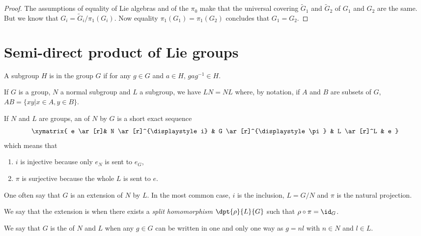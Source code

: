 \begin{proof}
	The assumptions of equality of Lie algebras and of the $\pi_0$ make that the universal covering $\tilde G_1$ and $\tilde G_2$ of $G_1$ and $G_2$ are the same. But we know that $G_i=\tilde G_i/\pi_1(G_i)$. Now equality $\pi_1(G_1)=\pi_1(G_2)$ concludes that $G_1=G_2$.
\end{proof}

\section{Semi-direct product of Lie groups}

\begin{definition}
	A subgroup $H$ is  in the group $G$ if for any $g\in G$ and $a\in H$, $gag^{-1}\in H$.
\end{definition}

If $G$ is a group, $N$ a normal subgroup and $L$ a subgroup, we have $LN=NL$ where, by notation, if $A$ and $B$ are subsets of $G$, $AB=\{xy|x\in A,y\in B\}$.

If $N$ and $L$ are groups, an  of $N$ by $G$ is a short exact sequence
\begin{equation}
	\xymatrix{ e \ar[r]& N \ar[r]^{\displaystyle i} & G \ar[r]^{\displaystyle \pi} & L \ar[r]^L  & e }
\end{equation}
which means that

\begin{enumerate}
	\item $i$ is injective because only $e_N$ is sent to $e_G$,
	\item $\pi$ is surjective because the whole $L$ is sent to $e$.
\end{enumerate}
One often say that $G$ is an extension of $N$ by $L$. In the most common case, $i$ is the inclusion, $L=G/N$ and $\pi$ is the natural projection.

We say that the extension is  when there exists a \emph{split homomorphism} $\dpt{\rho}{L}{G}$ such that $\rho\circ\pi=\id_G$.

\begin{definition}
	We say that $G$ is the  of $N$ and $L$ when any $g\in G$ can be written in one and only one way as $g=nl$ with $n\in N$ and $l\in L$.
\end{definition}


